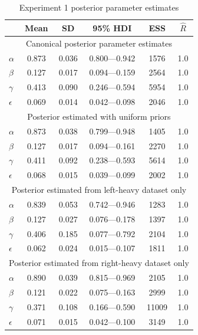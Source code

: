 \documentclass[doc,biblatex]{apa7}
\begin{document}
\clearpage

\begin{table}
\begin{center}
\begin{threeparttable}
\caption{Experiment 1 posterior parameter estimates}
\footnotesize
\begin{tabular}{lccccc}
\toprule
{} &   Mean &     SD &  95\% HDI &  ESS &  $\hat{R}$ \\
\midrule
\multicolumn{6}{c}{Canonical posterior parameter estimates} \\
\midrule
$\alpha$ &  0.873 &  0.036 &     0.800---0.942 &    1576 &    1.0 \\
$\beta$ &  0.127 &  0.017 &     0.094---0.159 &    2564 &    1.0 \\
$\gamma$ &  0.413 &  0.090 &     0.246---0.594 &    5954 &    1.0 \\
$\epsilon$ &  0.069 &  0.014 &     0.042---0.098 &    2046 &    1.0 \\
\midrule
\multicolumn{6}{c}{Posterior estimated with uniform priors} \\
\midrule
$\alpha$ &  0.873 &  0.038 &     0.799---0.948 &    1405 &    1.0 \\
$\beta$ &  0.127 &  0.017 &     0.094---0.161 &    2270 &    1.0 \\
$\gamma$ &  0.411 &  0.092 &     0.238---0.593 &    5614 &    1.0 \\
$\epsilon$ &  0.068 &  0.015 &     0.039---0.099 &    2002 &    1.0 \\
\midrule
\multicolumn{6}{c}{Posterior estimated from left-heavy dataset only} \\
\midrule
$\alpha$ &  0.839 &  0.053 &     0.742---0.946 &    1283 &    1.0 \\
$\beta$ &  0.127 &  0.027 &     0.076---0.178 &    1397 &    1.0 \\
$\gamma$ &  0.406 &  0.185 &     0.077---0.792 &    2104 &    1.0 \\
$\epsilon$ &  0.062 &  0.024 &     0.015---0.107 &    1811 &    1.0 \\
\midrule
\multicolumn{6}{c}{Posterior estimated from right-heavy dataset only} \\
\midrule
$\alpha$ &  0.890 &  0.039 &     0.815---0.969 &    2105 &    1.0 \\
$\beta$ &  0.121 &  0.022 &     0.075---0.163 &    2999 &    1.0 \\
$\gamma$ &  0.371 &  0.108 &     0.166---0.590 &   11009 &    1.0 \\
$\epsilon$ &  0.071 &  0.015 &     0.042---0.100 &    3149 &    1.0 \\
\bottomrule
\end{tabular}
\label{supptable1}
\end{threeparttable}
\end{center}
\end{table}
\end{document}
